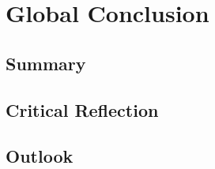 \chapter{Global Conclusion}
\label{global:conlusion}
\section{Summary}
\newpage
\section{Critical Reflection}
\newpage
\section{Outlook}
\newpage

